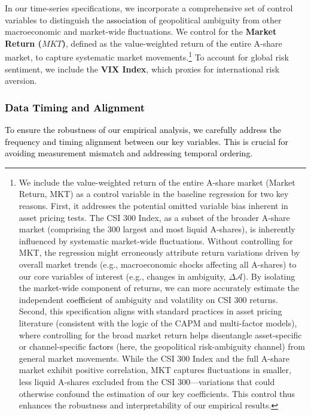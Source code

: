 \documentclass[preprint,12pt,authoryear]{elsarticle}
\begin{document}
In our time-series specifications, we incorporate a comprehensive set of control variables to distinguish the \textcolor{black}{association} of geopolitical ambiguity from other macroeconomic and market-wide fluctuations. We control for the \textbf{Market Return ($MKT$)}, defined as the value-weighted return of the entire A-share market, to capture systematic market movements.\footnote{We include the value-weighted return of the entire A-share market (Market Return, MKT) as a control variable in the baseline regression for two key reasons. First, it addresses the potential omitted variable bias inherent in asset pricing tests. The CSI 300 Index, as a subset of the broader A-share market (comprising the 300 largest and most liquid A-shares), is inherently influenced by systematic market-wide fluctuations. Without controlling for MKT, the regression might erroneously attribute return variations driven by overall market trends (e.g., macroeconomic shocks affecting all A-shares) to our core variables of interest (e.g., changes in ambiguity, $\Delta\mathcal{A}$). By isolating the market-wide component of returns, we can more accurately estimate the independent \textcolor{black}{coefficient} of ambiguity and volatility on CSI 300 returns. Second, this specification aligns with standard practices in asset pricing literature (consistent with the logic of the CAPM and multi-factor models), where controlling for the broad market return helps disentangle asset-specific or channel-specific \textcolor{black}{factors} (here, the geopolitical risk-ambiguity channel) from general market movements. While the CSI 300 Index and the full A-share market exhibit positive correlation, MKT captures fluctuations in smaller, less liquid A-shares excluded from the CSI 300—variations that could otherwise confound the estimation of our key coefficients. This control thus enhances the robustness and interpretability of our empirical results.} To account for global risk sentiment, we include the \textbf{VIX Index}, which proxies for international risk aversion.

\subsubsection{\textcolor{black}{Data Timing and Alignment}}
\textcolor{black}{To ensure the robustness of our empirical analysis, we carefully address the frequency and timing alignment between our key variables. This is crucial for avoiding measurement mismatch and addressing temporal ordering.}
\end{document}
